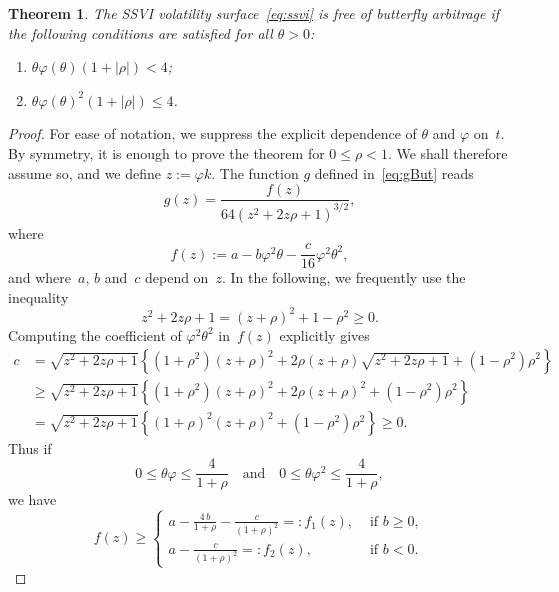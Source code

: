 \documentclass[12pt]{article}
\newtheorem{theorem}{Theorem}[section]
\numberwithin{equation}{section}
\begin{document}
\begin{theorem}\label{thm:Butterfly}
The SSVI volatility surface~\eqref{eq:ssvi} is free of butterfly arbitrage if the following conditions are satisfied
for all $\theta>0$:
\begin{enumerate}
\item $\theta\varphi(\theta)\left(1+|\rho|\right)< 4$;\label{item:RLasymptote}
\item $\theta\varphi(\theta)^2\left(1+|\rho|\right)\leq 4$.\label{item:phi2condition}
\end{enumerate}
\end{theorem}



\begin{proof}
For ease of notation, we suppress the explicit dependence of $\theta$ and $\varphi$ on~$t$.
By symmetry, it is enough to prove the theorem for $0\leq \rho<1$.
We shall therefore assume so, and we define $z:=\varphi k$.
The function $g$ defined in~\eqref{eq:gBut} reads
$$
g(z)=\frac{f(z)}{64 \left(z^2+2z\rho +1\right)^{3/2}},
$$
where
$$
f(z):=a-b\varphi^2\theta-\frac{c}{16}\varphi^2\theta^2,
$$
and where~$a$, $b$ and~$c$ depend on~$z$.
In the following, we frequently use the inequality
$$
z^2+2 z \rho +1=(z+\rho)^2+1-\rho^2 \ge 0.
$$
Computing the coefficient of $\varphi^2\theta^2$ in~$f(z)$ explicitly gives
\begin{align*}
c & = \sqrt{z^2+2 z \rho +1} \left\{\left(1+\rho ^2\right)\left(z+\rho\right)^2+2\rho (z+\rho)\sqrt{z^2+2 z \rho+1}+\left(1-\rho^2\right) \rho ^2\right\}\\
  & \geq \sqrt{z^2+2 z \rho +1} \left\{\left(1+\rho^2\right)\left(z+\rho\right)^2+2 \rho  (z+\rho )^2 +\left(1-\rho^2\right)\rho^2\right\}\\
  & = \sqrt{z^2+2 z \rho +1}\left\{\left(1+\rho\right)^2 \left(z+\rho\right)^2+\left(1-\rho^2\right) \rho ^2\right\}
  \geq 0.
\end{align*}
Thus if
$$
0\leq \theta\varphi \leq \frac 4 {1+\rho}
\quad \text{and} \quad
0\leq \theta\varphi^2\leq \frac 4 {1+\rho},
$$
we have
$$
f(z) \geq \left\{
\begin{array}{ll}
\displaystyle a - \frac{4\,b}{1+\rho}-\frac{c}{(1+\rho)^2}=:f_1(z), & \text{ if } b\geq 0, \\
\displaystyle  a -\frac{c}{(1+\rho)^2}=:f_2(z),  & \text{ if }    b<0.
\end{array}
\right.
$$


\end{proof}
\end{document}
